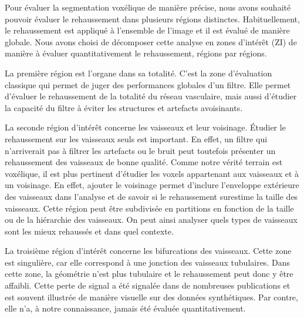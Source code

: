 Pour évaluer la segmentation voxélique de manière précise, nous avons souhaité pouvoir évaluer le rehaussement dans plusieurs régions distinctes. Habituellement, le rehaussement est appliqué à l'ensemble de l'image et il est évalué de manière globale. Nous avons choisi de décomposer cette analyse en zones d'intérêt (ZI) de manière à évaluer quantitativement le rehaussement, régions par régions.

La première région est l'organe dans sa totalité. C'est la zone d'évaluation classique qui permet de juger des performances globales d'un filtre. Elle permet d'évaluer le rehaussement de la totalité du réseau vasculaire, mais aussi d'étudier la capacité du filtre à éviter les structures et artefacts avoisinants.

La seconde région d'intérêt concerne les vaisseaux et leur voisinage. Étudier le rehaussement sur les vaisseaux seuls est important. En effet, un filtre qui n'arriverait pas à filtrer les artefacts ou le bruit peut toutefois présenter un rehaussement des vaisseaux de bonne qualité. Comme notre vérité terrain est voxélique, il est plus pertinent d'étudier les voxels appartenant aux vaisseaux et à un voisinage. En effet, ajouter le voisinage permet d'inclure l'enveloppe extérieure des vaisseaux dans l'analyse et de savoir si le rehaussement surestime la taille des vaisseaux. Cette région peut être subdivisée en partitions en fonction de la taille ou de la hiérarchie des vaisseaux. On peut ainsi analyser quels types de vaisseaux sont les mieux rehaussés et dans quel contexte.

La troisième région d'intérêt concerne les bifurcations des vaisseaux. Cette zone est singulière, car elle correspond à une jonction des vaisseaux tubulaires. Dans cette zone, la géométrie n'est plus tubulaire et le rehaussement peut donc y être affaibli. Cette perte de signal a été signalée dans de nombreuses publications et est souvent illustrée de manière visuelle sur des données synthétiques. Par contre, elle n'a, à notre connaissance, jamais été évaluée quantitativement.

